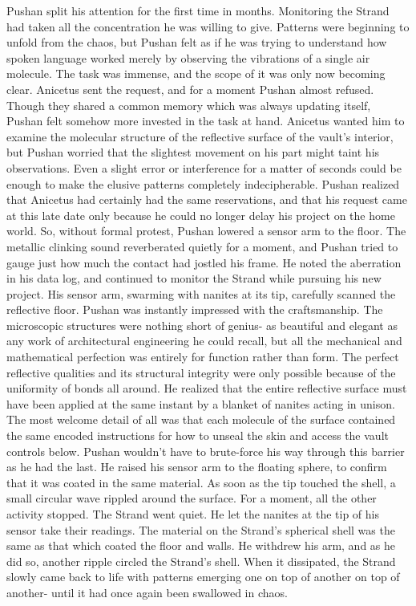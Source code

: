\documentclass[a4paper]{article}
\begin{document}
Pushan split his attention for the first time in months. Monitoring the Strand had taken all the concentration he was willing to give. Patterns were beginning to unfold from the chaos, but Pushan felt as if he was trying to understand how spoken language worked merely by observing the vibrations of a single air molecule. The task was immense, and the scope of it was only now becoming clear.
Anicetus sent the request, and for a moment Pushan almost refused. Though they shared a common memory which was always updating itself, Pushan felt somehow more invested in the task at hand. Anicetus wanted him to examine the molecular structure of the reflective surface of the vault’s interior, but Pushan worried that the slightest movement on his part might taint his observations. Even a slight error or interference for a matter of seconds could be enough to make the elusive patterns completely indecipherable.
Pushan realized that Anicetus had certainly had the same reservations, and that his request came at this late date only because he could no longer delay his project on the home world. So, without formal protest, Pushan lowered a sensor arm to the floor. The metallic clinking sound reverberated quietly for a moment, and Pushan tried to gauge just how much the contact had jostled his frame. He noted the aberration in his data log, and continued to monitor the Strand while pursuing his new project.
His sensor arm, swarming with nanites at its tip, carefully scanned the reflective floor. Pushan was instantly impressed with the craftsmanship. The microscopic structures were nothing short of genius- as beautiful and elegant as any work of architectural engineering he could recall, but all the mechanical and mathematical perfection was entirely for function rather than form. The perfect reflective qualities and its structural integrity were only possible because of the uniformity of bonds all around. He realized that the entire reflective surface must have been applied at the same instant by a blanket of nanites acting in unison. The most welcome detail of all was that each molecule of the surface contained the same encoded instructions for how to unseal the skin and access the vault controls below. Pushan wouldn’t have to brute-force his way through this barrier as he had the last.
He raised his sensor arm to the floating sphere, to confirm that it was coated in the same material. As soon as the tip touched the shell, a small circular wave rippled around the surface. For a moment, all the other activity stopped. The Strand went quiet.
He let the nanites at the tip of his sensor take their readings. The material on the Strand’s spherical shell was the same as that which coated the floor and walls. He withdrew his arm, and as he did so, another ripple circled the Strand’s shell. When it dissipated, the Strand slowly came back to life with patterns emerging one on top of another on top of another- until it had once again been swallowed in chaos.
\end{document}

